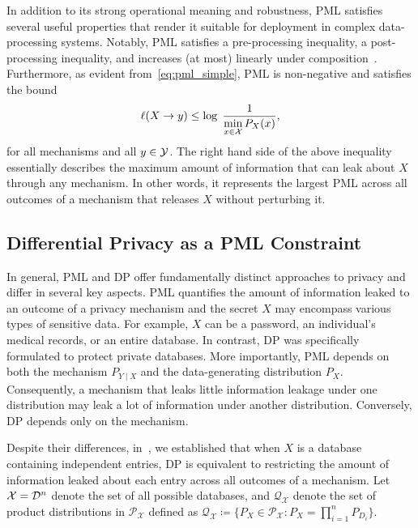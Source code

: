 In addition to its strong operational meaning and robustness, PML satisfies several useful properties that render it suitable for deployment in complex data-processing systems. Notably, PML satisfies a pre-processing inequality, a post-processing inequality, and increases (at most) linearly under composition~\cite[Lemma 1]{saeidian2023pointwise_it}. Furthermore, as evident from~\eqref{eq:pml_simple}, PML is non-negative and satisfies the bound
\begin{equation}
\label{eq:pml_bounds}
    \ell(X \to y) \leq \log \; \frac{1}{\min\limits_{x \in \mathcal{X}} P_X(x)},
\end{equation}
for all mechanisms and all $y \in \mathcal{Y}$. The right hand side of the above inequality essentially describes the maximum amount of information that can leak about $X$ through any mechanism. In other words, it represents the largest PML across all outcomes of a mechanism that releases $X$ without perturbing it.

\subsection{Differential Privacy as a PML Constraint}
In general, PML and DP offer fundamentally distinct approaches to privacy and differ in several key aspects. PML quantifies the amount of information leaked to an outcome of a privacy mechanism and the secret $X$ may encompass various types of sensitive data. For example, $X$ can be a password, an individual's medical records, or an entire database. In contrast, DP was specifically formulated to protect private databases. More importantly, PML depends on both the mechanism $P_{Y \mid X}$ and the data-generating distribution $P_X$. Consequently, a mechanism that leaks little information leakage under one distribution may leak a lot of information under another distribution. Conversely, DP depends only on the mechanism. 

Despite their differences, in~\cite[Thm. 4.2]{inferential_privacy}, we established that when $X$ is a database containing independent entries, DP is equivalent to restricting the amount of information leaked about each entry across all outcomes of a mechanism. Let $\mathcal{X} = \mathcal{D}^n$ denote the set of all possible databases, and $\mathcal Q_\mathcal X$ denote the set of product distributions in $\mathcal P_{\mathcal X}$ defined as $\mathcal Q_\mathcal X \coloneqq \{P_{X} \in \mathcal P_{\mathcal X} \colon P_{X} = \prod_{i=1}^n P_{D_i} \}$.


